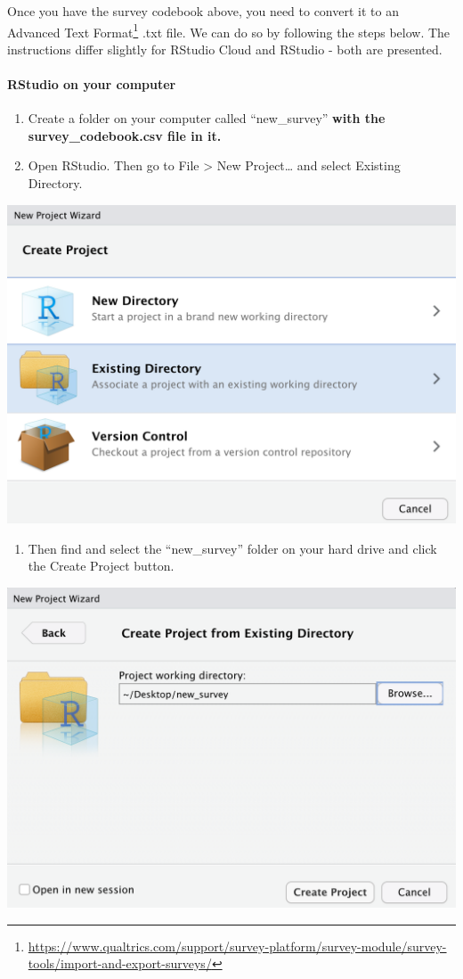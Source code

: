 \documentclass[
]{krantz}
\providecommand{\tightlist}{%
  \setlength{\itemsep}{0pt}\setlength{\parskip}{0pt}}
\renewcommand{\href}[2]{#2\footnote{\url{#1}}}
\begin{document}
Once you have the survey codebook above, you need to convert it to an \href{https://www.qualtrics.com/support/survey-platform/survey-module/survey-tools/import-and-export-surveys/}{Advanced Text Format} .txt file. We can do so by following the steps below. The instructions differ slightly for RStudio Cloud and RStudio - both are presented.

\hypertarget{rstudio-on-your-computer}{%
\paragraph{RStudio on your computer}\label{rstudio-on-your-computer}}

\begin{enumerate}
\def\labelenumi{\arabic{enumi}.}
\item
  Create a folder on your computer called ``new\_survey'' \textbf{with the survey\_codebook.csv file in it.}
\item
  Open RStudio. Then go to File \textgreater{} New Project\ldots{} and select Existing Directory.
\end{enumerate}

\includegraphics[width=0.5\linewidth]{ch_qualtrics/images/screenshot_existing_dir}

\begin{enumerate}
\def\labelenumi{\arabic{enumi}.}
\setcounter{enumi}{1}
\tightlist
\item
  Then find and select the ``new\_survey'' folder on your hard drive and click the Create Project button.
\end{enumerate}

\includegraphics[width=0.5\linewidth]{ch_qualtrics/images/screenshot_folder}
\end{document}
